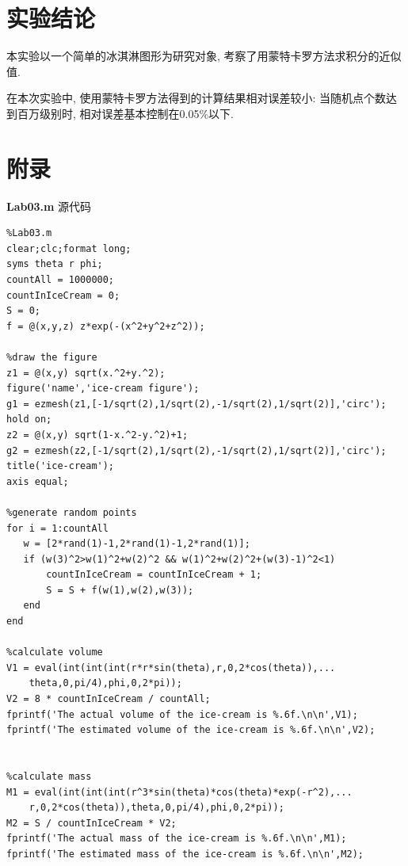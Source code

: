 \documentclass[a4paper,12pt]{article}
\begin{document}
\begin{CJK*}{UTF8}{gbsn}
\section{实验结论}
本实验以一个简单的冰淇淋图形为研究对象, 考察了用蒙特卡罗方法求积分的近似值.\par
在本次实验中, 使用蒙特卡罗方法得到的计算结果相对误差较小: 当随机点个数达到百万级别时, 相对误差基本控制在0.05\%以下.

\section{附录}
\noindent\textbf{Lab03.m} 源代码
\vspace{-10pt}
\lstset{basicstyle=\ttfamily\footnotesize,escapechar=`}
\begin{lstlisting}
%Lab03.m
clear;clc;format long;
syms theta r phi;
countAll = 1000000;
countInIceCream = 0;
S = 0;
f = @(x,y,z) z*exp(-(x^2+y^2+z^2));

%draw the figure
z1 = @(x,y) sqrt(x.^2+y.^2);
figure('name','ice-cream figure');
g1 = ezmesh(z1,[-1/sqrt(2),1/sqrt(2),-1/sqrt(2),1/sqrt(2)],'circ');
hold on;
z2 = @(x,y) sqrt(1-x.^2-y.^2)+1;
g2 = ezmesh(z2,[-1/sqrt(2),1/sqrt(2),-1/sqrt(2),1/sqrt(2)],'circ');
title('ice-cream');
axis equal;

%generate random points
for i = 1:countAll
   w = [2*rand(1)-1,2*rand(1)-1,2*rand(1)];
   if (w(3)^2>w(1)^2+w(2)^2 && w(1)^2+w(2)^2+(w(3)-1)^2<1)
       countInIceCream = countInIceCream + 1;
       S = S + f(w(1),w(2),w(3));
   end
end

%calculate volume
V1 = eval(int(int(int(r*r*sin(theta),r,0,2*cos(theta)),...
    theta,0,pi/4),phi,0,2*pi));
V2 = 8 * countInIceCream / countAll;
fprintf('The actual volume of the ice-cream is %.6f.\n\n',V1);
fprintf('The estimated volume of the ice-cream is %.6f.\n\n',V2);


%calculate mass
M1 = eval(int(int(int(r^3*sin(theta)*cos(theta)*exp(-r^2),...
    r,0,2*cos(theta)),theta,0,pi/4),phi,0,2*pi));
M2 = S / countInIceCream * V2;
fprintf('The actual mass of the ice-cream is %.6f.\n\n',M1);
fprintf('The estimated mass of the ice-cream is %.6f.\n\n',M2);
\end{lstlisting}




\end{CJK*}
\end{document}
